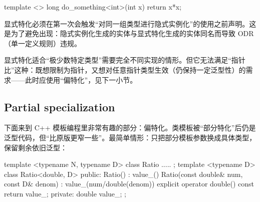 \begin{code}
template <> long do_something<int>(int x) { return x*x; }
\end{code}

显式特化必须在第一次会触发“对同一组类型进行隐式实例化”的使用之前声明。这是为了避免出现：隐式实例化生成的实体与显式特化生成的实体同名而导致 ODR（单一定义规则）违规。

显式特化适合“极少数特定类型”需要完全不同实现的情形。但它无法满足“指针比”这种：既想限制为指针，又想对任意指针类型生效（仍保持一定泛型性）的需求——此时应使用“偏特化”，见下一小节。

\subsection{Partial specialization}
下面来到 C++ 模板编程里非常有趣的部分：偏特化。类模板被“部分特化”后仍是泛型代码，但“比原版更窄一些”。最简单情形：只把部分模板参数换成具体类型，保留剩余依旧泛型：

\begin{code}
template <typename N, typename D> class Ratio {
  .....
};
template <typename D> class Ratio<double, D> {
  public:
  Ratio() : value_() {}
  Ratio(const double& num, const D& denom) :
    value_(num/double(denom)) {}
  explicit operator double() const { return value_; }
  private:
  double value_;
};
\end{code}

